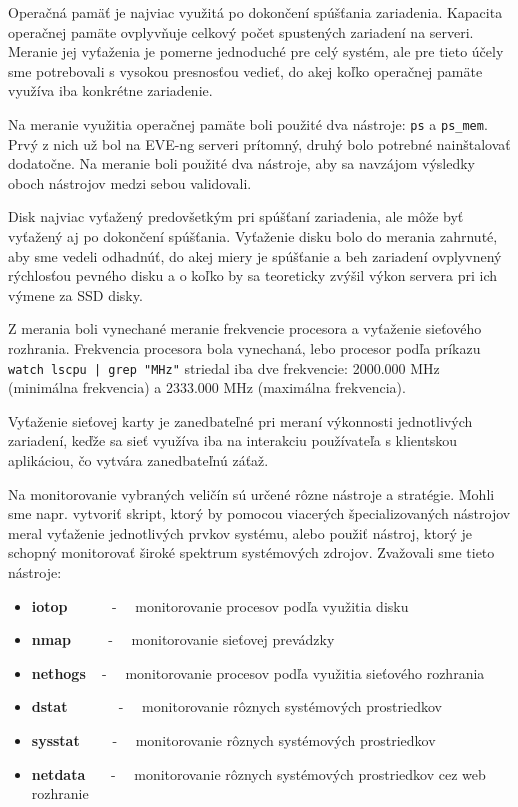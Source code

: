 Operačná pamäť je najviac využitá po dokončení spúšťania zariadenia. Kapacita operačnej pamäte ovplyvňuje celkový počet spustených zariadení na serveri. Meranie jej vyťaženia je pomerne jednoduché pre celý systém, ale pre tieto účely sme potrebovali s vysokou presnosťou vedieť, do akej koľko operačnej pamäte využíva iba konkrétne zariadenie.

Na meranie využitia operačnej pamäte boli použité dva nástroje: \texttt{ps} a \texttt{ps\_mem}. Prvý z nich už bol na EVE-ng serveri prítomný, druhý bolo potrebné nainštalovať dodatočne. Na meranie boli použité dva nástroje, aby sa navzájom výsledky oboch nástrojov medzi sebou validovali.

Disk najviac vyťažený predovšetkým pri spúšťaní zariadenia, ale môže byť vyťažený aj po dokončení spúšťania. Vyťaženie disku bolo do merania zahrnuté, aby sme vedeli odhadnúť, do akej miery je spúšťanie a beh zariadení ovplyvnený rýchlosťou pevného disku a o koľko by sa teoreticky zvýšil výkon servera pri ich výmene za SSD disky.

Z merania boli vynechané meranie frekvencie procesora a vyťaženie sieťového rozhrania. Frekvencia procesora bola vynechaná, lebo procesor podľa príkazu \texttt{watch lscpu | grep "MHz"} striedal iba dve frekvencie: 2000.000 MHz (minimálna frekvencia) a 2333.000 MHz (maximálna frekvencia).

Vyťaženie sieťovej karty je zanedbateľné pri meraní výkonnosti jednotlivých zariadení, keďže sa sieť využíva iba na interakciu používateľa s klientskou aplikáciou, čo vytvára zanedbateľnú záťaž.

Na monitorovanie vybraných veličín sú určené rôzne nástroje a stratégie. Mohli sme napr. vytvoriť skript, ktorý by pomocou viacerých špecializovaných nástrojov meral vyťaženie jednotlivých prvkov systému, alebo použiť nástroj, ktorý je schopný monitorovať široké spektrum systémových zdrojov. Zvažovali sme tieto nástroje:

\begin{itemize}[noitemsep]
    \item \textbf{iotop} ~~~~~ - ~~monitorovanie procesov podľa využitia disku
    \item \textbf{nmap} ~~~~ - ~~monitorovanie sieťovej prevádzky
    \item \textbf{nethogs} ~ - ~~monitorovanie procesov podľa využitia sieťového rozhrania
    \item \textbf{dstat} ~~~~~~ - ~~monitorovanie rôznych systémových prostriedkov
    \item \textbf{sysstat} ~~~~- ~~monitorovanie rôznych systémových prostriedkov
    \item \textbf{netdata} ~~~- ~~monitorovanie rôznych systémových prostriedkov cez web rozhranie
\end{itemize}

